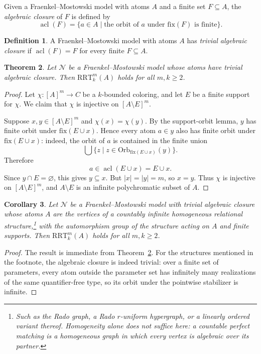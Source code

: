 \documentclass[11pt]{amsart}
\newtheorem{theorem}{Theorem}[section]
\newtheorem{corollary}[theorem]{Corollary}
\theoremstyle{definition}
\newtheorem{definition}[theorem]{Definition}
\DeclareMathOperator{\acl}{acl}
\newcommand{\RRT}{\mathrm{RRT}}
\newcommand{\NN}{\mathcal{N}}
\begin{document}
Given a Fraenkel--Mostowski model with atoms \(A\) and a finite set \(F\subseteq A\), the \emph{algebraic closure} of \(F\) is defined by
\[
    \acl(F)=\{a\in A\mid \text{the orbit of }a\text{ under }\mathrm{fix}(F)\text{ is finite}\}.
\]

\begin{definition}\label{def:tac}
A Fraenkel--Mostowski model with atoms \(A\) has \emph{trivial algebraic closure} if \(\acl(F)=F\) for every finite \(F\subseteq A\).
\end{definition}

\begin{theorem}\label{thm:tac}
Let \(\NN\) be a Fraenkel--Mostowski model whose atoms have trivial algebraic closure.  Then \(\RRT^m_k(A)\) holds for all \(m,k\geq 2\).
\end{theorem}

\begin{proof}
Let \(\chi:[A]^m\to C\) be a \(k\)-bounded coloring, and let \(E\) be a finite support for \(\chi\).  We claim that \(\chi\) is injective on \([A\setminus E]^m\).

Suppose \(x,y\in[A\setminus E]^m\) and \(\chi(x)=\chi(y)\).  By the support-orbit lemma, \(y\) has finite orbit under \(\mathrm{fix}(E\cup x)\).  Hence every atom \(a\in y\) also has finite orbit under \(\mathrm{fix}(E\cup x)\): indeed, the orbit of \(a\) is contained in the finite union
\[
    \bigcup\{z\mid z\in \mathrm{Orb}_{\mathrm{fix}(E\cup x)}(y)\}.
\]
Therefore
\[
    a\in\acl(E\cup x)=E\cup x.
\]
Since \(y\cap E=\varnothing\), this gives \(y\subseteq x\).  But \(|x|=|y|=m\), so \(x=y\).  Thus \(\chi\) is injective on \([A\setminus E]^m\), and \(A\setminus E\) is an infinite polychromatic subset of \(A\).
\end{proof}

\begin{corollary}
Let \(\NN\) be a Fraenkel--Mostowski model with trivial algebraic closure whose atoms \(A\) are the vertices of a countably infinite homogeneous relational structure,\footnote{Such as the Rado graph, a Rado \(r\)-uniform hypergraph, or a linearly ordered variant thereof.  Homogeneity alone does not suffice here: a countable perfect matching is a homogeneous graph in which every vertex is algebraic over its partner.} with the automorphism group of the structure acting on \(A\) and finite supports.  Then \(\RRT^m_k(A)\) holds for all \(m,k\geq 2\).
\end{corollary}

\begin{proof}
The result is immediate from Theorem~\ref{thm:tac}.  For the structures mentioned in the footnote, the algebraic closure is indeed trivial: over a finite set of parameters, every atom outside the parameter set has infinitely many realizations of the same quantifier-free type, so its orbit under the pointwise stabilizer is infinite.
\end{proof}
\end{document}
